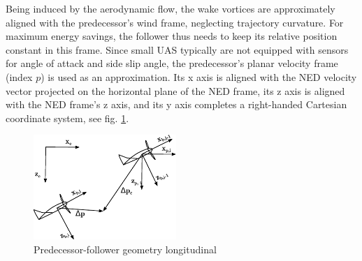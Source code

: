 \documentclass{ifacconf}
\begin{document}
Being induced by the aerodynamic flow, the wake vortices are approximately aligned with the predecessor's wind frame, neglecting trajectory curvature. For maximum energy savings, the follower thus needs to keep its relative position constant in this frame. Since small UAS typically are not equipped with sensors for angle of attack and side slip angle, the predecessor's planar velocity frame (index $p$) is used as an approximation. Its x axis is aligned with the NED velocity vector projected on the horizontal plane of the NED frame, its z axis is aligned with the NED frame's z axis, and its y axis completes a right-handed Cartesian coordinate system, see fig. \ref{fig:frames}. 
\begin{figure}
\begin{center}
\includegraphics[width=5.4cm]{frames.pdf}    %
\caption{Predecessor-follower geometry longitudinal}
\label{fig:frames}
\end{center}
\end{figure}
\end{document}
